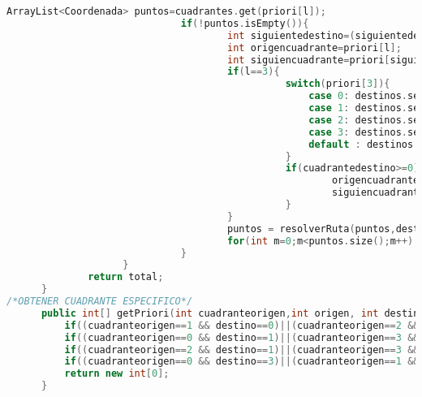 \begin{lstlisting}[language=C++, caption=Algoritmo Base del Método de Cuadrantes, label=lst:codigo11,escapechar=|]
                              ArrayList<Coordenada> puntos=cuadrantes.get(priori[l]);
                              if(!puntos.isEmpty()){
                                      int siguientedestino=(siguientedestino>3)? 0 : (l+1);
                                      int origencuadrante=priori[l];
                                      int siguiencuadrante=priori[siguientedestino];
                                      if(l==3){
                                                switch(priori[3]){
                                                    case 0: destinos.set(0,new Coordenada(min.x,min.y));
                                                    case 1: destinos.set(1,new Coordenada(max.x,min.y));
                                                    case 2: destinos.set(2,new Coordenada(max.x,max.y));                               
                                                    case 3: destinos.set(3,new Coordenada(min.x,max.y));
                                                    default : destinos.set(3,new Coordenada(centro.x,centro.y)); 
                                                }      
                                                if(cuadrantedestino>=0) {
                                                        origencuadrante = cuadranteorigen;
                                                        siguiencuadrante = cuadrantedestino;
                                                }                                                    
                                      }    
                                      puntos = resolverRuta(puntos,destinos.get(priori[l]),origencuadrante,siguiencuadrante);                  
                                      for(int m=0;m<puntos.size();m++)  total.add(puntos.get(m));
                              }
                    }
              return total;
      }
/*OBTENER CUADRANTE ESPECIFICO*/    
      public int[] getPriori(int cuadranteorigen,int origen, int destino){
          if((cuadranteorigen==1 && destino==0)||(cuadranteorigen==2 && destino==3)|| (destino<0)||(destino>3))return izquierda[origen];
          if((cuadranteorigen==0 && destino==1)||(cuadranteorigen==3 && destino==2))return derecha[origen];
          if((cuadranteorigen==2 && destino==1)||(cuadranteorigen==3 && destino==0))return arriba[origen];
          if((cuadranteorigen==0 && destino==3)||(cuadranteorigen==1 && destino==2))return abajo[origen];
          return new int[0];
      }
\end{lstlisting} 